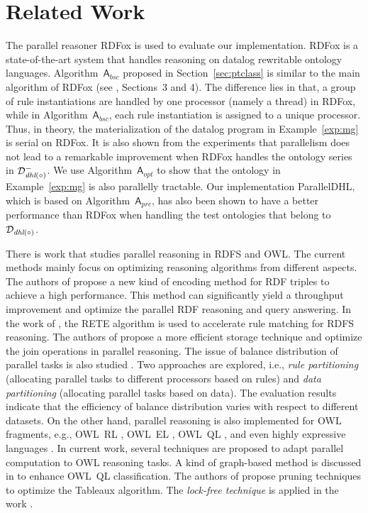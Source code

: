 \documentclass[final,1p,times]{elsarticle}
\begin{document}
\section{Related Work}
\label{sec:related}

The parallel reasoner RDFox \cite{MotikNPHO14} is used to evaluate our implementation. RDFox is a state-of-the-art system that handles reasoning on datalog rewritable ontology languages. Algorithm~$\mathsf{A}_{bsc}$ proposed in Section~\ref{sec:ptclass} is similar to the main algorithm of RDFox (see \cite{MotikNPHO14}, Sections~3 and 4). The difference lies in that, a group of rule instantiations are handled by one processor (namely a thread) in RDFox, while in Algorithm~$\mathsf{A}_{bsc}$, each rule instantiation is assigned to a unique processor. Thus, in theory, the materialization of the datalog program in Example~\ref{exp:mg} is serial on RDFox. It is also shown from the experiments that parallelism does not lead to a remarkable improvement when RDFox handles the ontology series in $\mathcal{D}^-_{\textit{\text{dhl}}(\circ)}$. We use Algorithm~$\mathsf{A}_{opt}$ to show that the ontology in Example~\ref{exp:mg} is also parallelly tractable. Our implementation ParallelDHL, which is based on Algorithm~$\mathsf{A}_{prc}$, has also been shown to have a better performance than RDFox when handling the test ontologies that belong to $\mathcal{D}_{\textit{\text{dhl}}(\circ)}$.

There is work that studies parallel reasoning in RDFS and OWL. The current methods mainly focus on optimizing reasoning algorithms from different aspects. The authors of \cite{GoodmanJMAAH11} propose a new kind of encoding method for RDF triples to achieve a high performance. This method can significantly yield a throughput improvement and optimize the parallel RDF reasoning and query answering. In the work of \cite{PetersSZ15}, the RETE algorithm is used to accelerate rule matching for RDFS reasoning. The authors of \cite{SubercazeGCL16} propose a more efficient storage technique and optimize the join operations in parallel reasoning. The issue of balance distribution of parallel tasks is also studied \cite{SomaP08,WeaverH09}. Two approaches are explored, i.e., \emph{rule partitioning} (allocating parallel tasks to different processors based on rules) and \emph{data partitioning} (allocating parallel tasks based on data). The evaluation results indicate that the efficiency of balance distribution varies with respect to different datasets. On the other hand, parallel reasoning is also implemented for OWL fragments, e.g., OWL~RL \cite{KolovskiWE10}, OWL~EL \cite{KazakovKS14}, OWL~QL \cite{LemboSS13}, and even highly expressive languages \cite{SteigmillerLG14,LiebigM07,SchlichtS08,WuH12}. In current work, several techniques are proposed to adapt parallel computation to OWL reasoning tasks. A kind of graph-based method is discussed in \cite{LemboSS13} to enhance OWL~QL classification. The authors of \cite{LiebigM07,SchlichtS08,WuH12} propose pruning techniques to optimize the Tableaux algorithm. The \emph{lock-free technique} is applied in the work \cite{KazakovKS14,SteigmillerLG14}.
\end{document}
